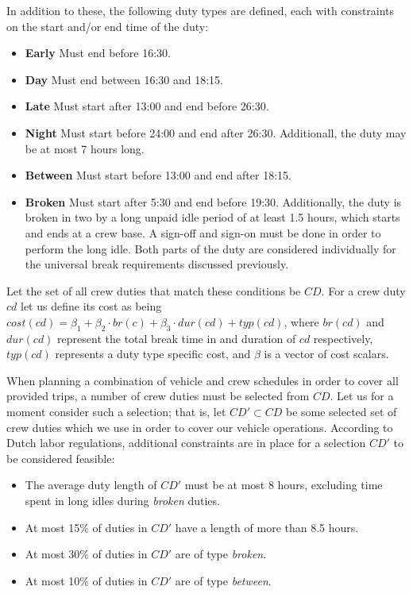 \documentclass[]{article}
\begin{document}
In addition to these, the following duty types are defined, each with constraints on the start and/or end time of the duty:
\begin{itemize}
  \item \textbf{Early} Must end before 16:30.
  \item \textbf{Day} Must end between 16:30 and 18:15.
  \item \textbf{Late} Must start after 13:00 and end before 26:30.
  \item \textbf{Night} Must start before 24:00 and end after 26:30. Additionall, the duty may be at most 7 hours long.
  \item \textbf{Between} Must start before 13:00 and end after 18:15.
  \item \textbf{Broken} Must start after 5:30 and end before 19:30. Additionally, the duty is broken in two by a long unpaid idle period of at least 1.5 hours, which starts and ends at a crew base. A sign-off and sign-on must be done in order to perform the long idle. Both parts of the duty are considered individually for the universal break requirements discussed previously.
\end{itemize}
Let the set of all crew duties that match these conditions be $CD$. For a crew duty $cd$ let us define its cost as being $cost(cd) = \beta_1 + \beta_2 \cdot br(c) + \beta_3 \cdot dur(cd) + typ(cd)$, where $br(cd)$ and $dur(cd)$ represent the total break time in and duration of $cd$ respectively, $typ(cd)$ represents a duty type specific cost, and $\beta$ is a vector of cost scalars. \newline

\noindent When planning a combination of vehicle and crew schedules in order to cover all provided trips, a number of crew duties must be selected from $CD$. Let us for a moment consider such a selection; that is, let $CD' \subset CD$ be some selected set of crew duties which we use in order to cover our vehicle operations. According to Dutch labor regulations, additional constraints are in place for a selection $CD'$ to be considered feasible: 
\begin{itemize}
  \item The average duty length of $CD'$ must be at most 8 hours, excluding time spent in long idles during \textit{broken} duties.
  \item At most 15\% of duties in $CD'$ have a length of more than 8.5 hours.
  \item At most 30\% of duties in $CD'$ are of type \textit{broken}.
  \item At most 10\% of duties in $CD'$ are of type \textit{between}.
\end{itemize} 
\end{document}
